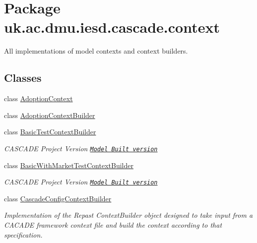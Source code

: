 \hypertarget{namespaceuk_1_1ac_1_1dmu_1_1iesd_1_1cascade_1_1context}{\section{Package uk.\-ac.\-dmu.\-iesd.\-cascade.\-context}
\label{namespaceuk_1_1ac_1_1dmu_1_1iesd_1_1cascade_1_1context}
}


All implementations of model contexts and context builders.  


\subsection*{Classes}
\begin{DoxyCompactItemize}
\item 
class \hyperlink{classuk_1_1ac_1_1dmu_1_1iesd_1_1cascade_1_1context_1_1_adoption_context}{Adoption\-Context}
\item 
class \hyperlink{classuk_1_1ac_1_1dmu_1_1iesd_1_1cascade_1_1context_1_1_adoption_context_builder}{Adoption\-Context\-Builder}
\item 
class \hyperlink{classuk_1_1ac_1_1dmu_1_1iesd_1_1cascade_1_1context_1_1_basic_test_context_builder}{Basic\-Test\-Context\-Builder}
\begin{DoxyCompactList}\small\item\em C\-A\-S\-C\-A\-D\-E Project Version \href{Version# for the entire project/ as whole}{\tt Model Built version} \end{DoxyCompactList}\item 
class \hyperlink{classuk_1_1ac_1_1dmu_1_1iesd_1_1cascade_1_1context_1_1_basic_with_market_test_context_builder}{Basic\-With\-Market\-Test\-Context\-Builder}
\begin{DoxyCompactList}\small\item\em C\-A\-S\-C\-A\-D\-E Project Version \href{Version# for the entire project/ as whole}{\tt Model Built version} \end{DoxyCompactList}\item 
class \hyperlink{classuk_1_1ac_1_1dmu_1_1iesd_1_1cascade_1_1context_1_1_cascade_config_context_builder}{Cascade\-Config\-Context\-Builder}
\begin{DoxyCompactList}\small\item\em Implementation of the Repast Context\-Builder object designed to take input from a C\-A\-C\-A\-D\-E framework context file and build the context according to that specification. \end{DoxyCompactList}\item 

\end{DoxyCompactItemize}

